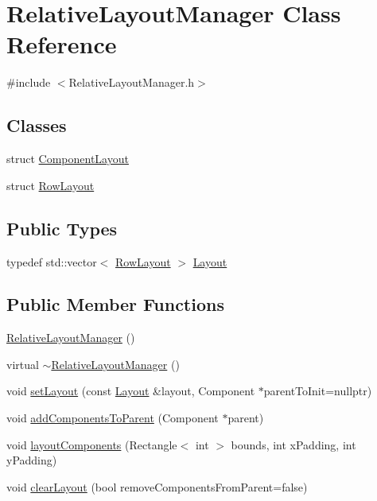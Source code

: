 \hypertarget{classRelativeLayoutManager}{}\section{Relative\+Layout\+Manager Class Reference}
\label{classRelativeLayoutManager}


{\ttfamily \#include $<$Relative\+Layout\+Manager.\+h$>$}

\subsection*{Classes}
\begin{DoxyCompactItemize}
\item 
struct \mbox{\hyperlink{structRelativeLayoutManager_1_1ComponentLayout}{Component\+Layout}}
\item 
struct \mbox{\hyperlink{structRelativeLayoutManager_1_1RowLayout}{Row\+Layout}}
\end{DoxyCompactItemize}
\subsection*{Public Types}
\begin{DoxyCompactItemize}
\item 
typedef std\+::vector$<$ \mbox{\hyperlink{structRelativeLayoutManager_1_1RowLayout}{Row\+Layout}} $>$ \mbox{\hyperlink{classRelativeLayoutManager_a3dcd4cd0bc41754f3b4a64bc29b5eca5}{Layout}}
\end{DoxyCompactItemize}
\subsection*{Public Member Functions}
\begin{DoxyCompactItemize}
\item 
\mbox{\hyperlink{classRelativeLayoutManager_aefdfc5247b3fe51a3586abde74438d08}{Relative\+Layout\+Manager}} ()
\item 
virtual \mbox{\hyperlink{classRelativeLayoutManager_a078b8cf0e38b4e16e4b024e3a101c933}{$\sim$\+Relative\+Layout\+Manager}} ()
\item 
void \mbox{\hyperlink{classRelativeLayoutManager_af030be088e9a0ae34cd1e8fff3724040}{set\+Layout}} (const \mbox{\hyperlink{classRelativeLayoutManager_a3dcd4cd0bc41754f3b4a64bc29b5eca5}{Layout}} \&layout, Component $\ast$parent\+To\+Init=nullptr)
\item 
void \mbox{\hyperlink{classRelativeLayoutManager_acf05615c90a1fe78c721fcbbdd08a027}{add\+Components\+To\+Parent}} (Component $\ast$parent)
\item 
void \mbox{\hyperlink{classRelativeLayoutManager_a3f32d37ee86f888f6be33d280e37918d}{layout\+Components}} (Rectangle$<$ int $>$ bounds, int x\+Padding, int y\+Padding)
\item 
void \mbox{\hyperlink{classRelativeLayoutManager_a1f4ff862ecf36502f83f48e625122ab3}{clear\+Layout}} (bool remove\+Components\+From\+Parent=false)
\end{DoxyCompactItemize}



